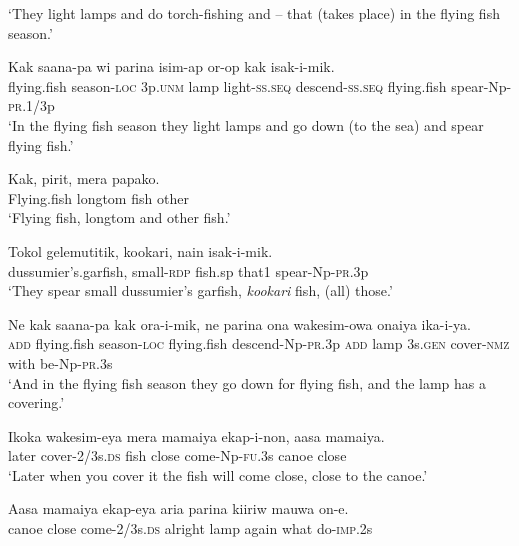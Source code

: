\glt ‘They light lamps and do torch-fishing and – that (takes place) in the flying fish season.’ \\
\z


\ea\label{ex:a:x40}
\gll  Kak  saana-pa  wi  parina  isim-ap              or-op  kak  isak-i-mik. \\
flying.fish  season-\textsc{loc}  3p.\textsc{unm}  lamp  light-\textsc{ss.seq}   descend-\textsc{ss.seq}  flying.fish  spear-Np-\textsc{pr}.1/3p \\


\glt ‘In the flying fish season they light lamps and go down (to the sea) and spear flying fish.’ \\
\z


\ea\label{ex:a:x41}
\gll  Kak,  pirit,  mera  papako. \\
Flying.fish  longtom  fish  other \\
\glt ‘Flying fish, longtom and other fish.’ \\
\z


\ea\label{ex:a:x42}
\gll  Tokol  gelemutitik,  kookari,  nain  isak-i-mik. \\
dussumier’s.garfish,  small-\textsc{rdp}  fish.sp  that1  spear-Np-\textsc{pr}.3p \\
\glt ‘They spear small dussumier’s garfish, \textit{kookari} fish, (all) those.’ \\
\z


\ea\label{ex:a:x43}
\gll  Ne  kak  saana-pa  kak  ora-i-mik,  ne                      parina  ona  wakesim-owa  onaiya  ika-i-ya. \\
\textsc{add}  flying.fish  season-\textsc{loc}  flying.fish  descend-Np-\textsc{pr}.3p  \textsc{add}  lamp  3s.\textsc{gen}  cover-\textsc{nmz}  with  be-Np-\textsc{pr}.3s \\


\glt ‘And in the flying fish season they go down for flying fish, and the lamp has a covering.’ \\
\z


\ea\label{ex:a:x44}
\gll  Ikoka  wakesim-eya  mera  mamaiya  ekap-i-non,  aasa  mamaiya. \\
later  cover-2/3s.\textsc{ds}  fish  close  come-Np-\textsc{fu}.3s      canoe  close \\


\glt ‘Later when you cover it the fish will come close, close to the canoe.’ \\
\z


\ea\label{ex:a:x45}
\gll  Aasa  mamaiya  ekap-eya  aria  parina  kiiriw    mauwa  on-e. \\
canoe  close  come-2/3s.\textsc{ds}  alright  lamp  again       what  do-\textsc{imp}.2s \\


